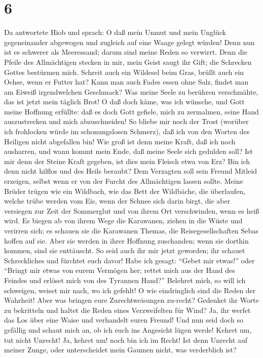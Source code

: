 \hypertarget{section-5}{%
\section{6}\label{section-5}}

 Da antwortete Hiob und sprach:  O daß mein
Unmut und mein Unglück gegeneinander abgewogen und zugleich auf eine
Waage gelegt würden!  Denn nun ist es schwerer als
Meeressand; darum sind meine Reden so verwirrt.  Denn die
Pfeile des Allmächtigen stecken in mir, mein Geist saugt ihr Gift; die
Schrecken Gottes bestürmen mich.  Schreit auch ein
Wildesel beim Gras, brüllt auch ein Ochse, wenn er Futter hat?
 Kann man auch Fades essen ohne Salz, findet man am Eiweiß
irgendwelchen Geschmack?  Was meine Seele zu berühren
verschmähte, das ist jetzt mein täglich Brot!  O daß doch
käme, was ich wünsche, und Gott meine Hoffnung erfüllte: 
daß es doch Gott gefiele, mich zu zermalmen, seine Hand auszustrecken
und mich abzuschneiden!  So bliebe mir noch der Trost
(worüber ich frohlocken würde im schonungslosen Schmerz), daß ich von
den Worten des Heiligen nicht abgefallen bin!  Wie groß
ist denn meine Kraft, daß ich noch ausharren, und wann kommt mein Ende,
daß meine Seele sich gedulden soll?  Ist mir denn der
Steine Kraft gegeben, ist dies mein Fleisch etwa von Erz?
 Bin ich denn nicht hilflos und des Heils beraubt?
 Dem Verzagten soll sein Freund Mitleid erzeigen, selbst
wenn er von der Furcht des Allmächtigen lassen sollte. 
Meine Brüder trügen wie ein Wildbach, wie das Bett der Wildbäche, die
überlaufen,  welche trübe werden vom Eis, wenn der Schnee
sich darin birgt,  die aber versiegen zur Zeit der
Sommerglut und von ihrem Ort verschwinden, wenn es heiß wird.
 Es biegen ab von ihrem Wege die Karawanen, ziehen in die
Wüste und verirren sich;  es schauen sie die Karawanen
Themas, die Reisegesellschaften Sebas hoffen auf sie. 
Aber sie werden in ihrer Hoffnung zuschanden; wenn sie dorthin kommen,
sind sie enttäuscht.  So seid auch ihr mir jetzt
geworden; ihr schauet Schreckliches und fürchtet euch davor!
 Habe ich gesagt: ``Gebet mir etwas!'' oder ``Bringt mir
etwas von eurem Vermögen her;  rettet mich aus der Hand
des Feindes und erlöset mich von des Tyrannen Hand?'' 
Belehret mich, so will ich schweigen,  weiset mir nach,
wo ich gefehlt! O wie eindringlich sind die Reden der Wahrheit! Aber was
bringen eure Zurechtweisungen zu-recht?  Gedenket ihr
Worte zu bekritteln und haltet die Reden eines Verzweifelten für Wind?
 Ja, ihr werfet das Los über eine Waise und verhandelt
euren Freund!  Und nun seid doch so gefällig und schaut
mich an, ob ich euch ins Angesicht lügen werde!  Kehret
um, tut nicht Unrecht! Ja, kehret um! noch bin ich im Recht!
 Ist denn Unrecht auf meiner Zunge, oder unterscheidet
mein Gaumen nicht, was verderblich ist?

